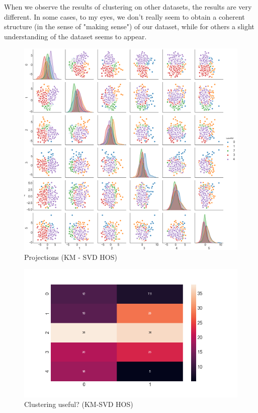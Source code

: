 \documentclass[15pt]{article}
\begin{document}
\begin{multicols}{2}
When we observe the results of clustering on other datasets, the results are very different. In some cases, to my eyes, we don't really seem to obtain a coherent structure (in the sense of "making sense") of our dataset, while for others a slight understanding of the dataset seems to appear.



\begin{figure}[H]
\centering
\includegraphics[width = \columnwidth]{pplothoskmsvd.png}
\caption{Projections (KM - SVD HOS)}
\end{figure}

\begin{figure}[H]
\centering
\includegraphics[width = \columnwidth]{grhoskmsvd.png}
\caption{Clustering useful? (KM-SVD HOS)}
\end{figure}


\end{multicols}
\end{document}
